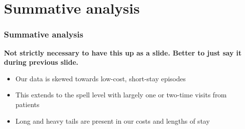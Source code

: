 \section{Summative analysis}

\begin{frame}
    \frametitle{Summative analysis}
    \textbf{Not strictly necessary to have this up as a slide. Better to just
    say it during previous slide.}
    \begin{itemize}
        \pause%
        \item Our data is skewed towards low-cost, short-stay episodes
        \pause%
        \item This extends to the spell level with largely one or two-time
            visits from patients
        \pause%
        \item Long and heavy tails are present in our costs and lengths of stay
    \end{itemize}
\end{frame}



